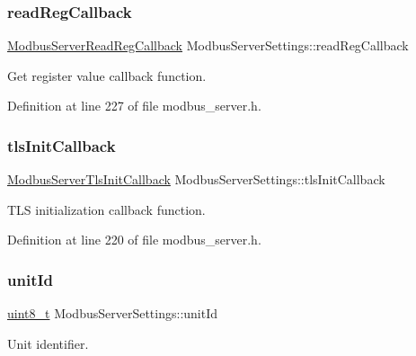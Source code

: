 \subsubsection{\texorpdfstring{read\+Reg\+Callback}{readRegCallback}}
{\footnotesize\ttfamily \hyperlink{modbus__server_8h_a3d9a52f0b248469bb1e36927cdb5ce91}{Modbus\+Server\+Read\+Reg\+Callback} Modbus\+Server\+Settings\+::read\+Reg\+Callback}



Get register value callback function. 



Definition at line 227 of file modbus\+\_\+server.\+h.

\mbox{\label{structModbusServerSettings_a47ec2e1ff36693be192539cd5543a742}} 
\subsubsection{\texorpdfstring{tls\+Init\+Callback}{tlsInitCallback}}
{\footnotesize\ttfamily \hyperlink{modbus__server_8h_adc1985b28525307a7cd3eeb66f61c949}{Modbus\+Server\+Tls\+Init\+Callback} Modbus\+Server\+Settings\+::tls\+Init\+Callback}



T\+LS initialization callback function. 



Definition at line 220 of file modbus\+\_\+server.\+h.

\mbox{\label{structModbusServerSettings_ad120c4c503d9d0a0c696393b6d1dd0c4}} 
\subsubsection{\texorpdfstring{unit\+Id}{unitId}}
{\footnotesize\ttfamily \hyperlink{stdint_8h_aba7bc1797add20fe3efdf37ced1182c5}{uint8\+\_\+t} Modbus\+Server\+Settings\+::unit\+Id}



Unit identifier. 




